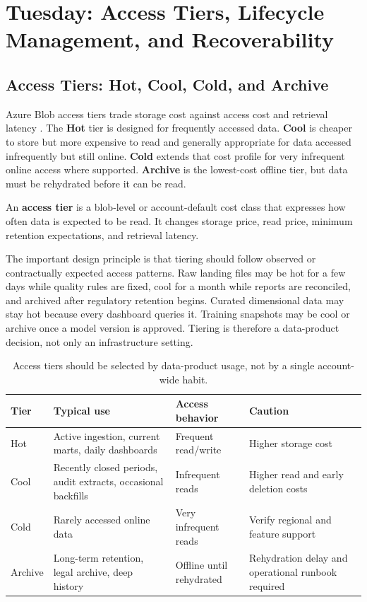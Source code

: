 \section{Tuesday: Access Tiers, Lifecycle Management, and Recoverability}

\subsection{Access Tiers: Hot, Cool, Cold, and Archive}
Azure Blob access tiers trade storage cost against access cost and retrieval latency \cite{microsoft2025accessTiers}. The \textbf{Hot} tier is designed for frequently accessed data. \textbf{Cool} is cheaper to store but more expensive to read and generally appropriate for data accessed infrequently but still online. \textbf{Cold} extends that cost profile for very infrequent online access where supported. \textbf{Archive} is the lowest-cost offline tier, but data must be rehydrated before it can be read.

\begin{definitionbox}
An \textbf{access tier} is a blob-level or account-default cost class that expresses how often data is expected to be read. It changes storage price, read price, minimum retention expectations, and retrieval latency.
\end{definitionbox}

The important design principle is that tiering should follow observed or contractually expected access patterns. Raw landing files may be hot for a few days while quality rules are fixed, cool for a month while reports are reconciled, and archived after regulatory retention begins. Curated dimensional data may stay hot because every dashboard queries it. Training snapshots may be cool or archive once a model version is approved. Tiering is therefore a data-product decision, not only an infrastructure setting.

\begin{table}[H]
\centering
\small
\begin{tabular}{@{}p{2.5cm}p{4.2cm}p{3.8cm}p{3.2cm}@{}}
\toprule
\textbf{Tier} & \textbf{Typical use} & \textbf{Access behavior} & \textbf{Caution} \\
\midrule
Hot & Active ingestion, current marts, daily dashboards & Frequent read/write & Higher storage cost \\
Cool & Recently closed periods, audit extracts, occasional backfills & Infrequent reads & Higher read and early deletion costs \\
Cold & Rarely accessed online data & Very infrequent reads & Verify regional and feature support \\
Archive & Long-term retention, legal archive, deep history & Offline until rehydrated & Rehydration delay and operational runbook required \\
\bottomrule
\end{tabular}
\caption{Access tiers should be selected by data-product usage, not by a single account-wide habit.}
\label{tab:access-tiers}
\end{table}

